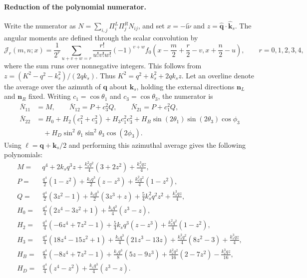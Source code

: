 \documentclass[a4paper,12pt]{article}
\newcommand{\ii}{\mathrm i}
\newcommand{\mb}{\mathbf}
\newcommand{\tn}{\tilde\nu}
\begin{document}
\paragraph{Reduction of the polynomial numerator.}
\label{sec:bubble-reduction}
Write the numerator as
$N=\sum_{i,j}\Pi_i^L\Pi_j^R N_{ij}$, and set
$x=-\ii\tn$ and $z=\widehat{\mb q}\cdot\widehat{\mb k}_s$.
The angular moments are defined through the scalar convolution by
\begin{equation}
 \mathcal J_r(m,n;x)=\frac1{2^r}
 \sum_{u+v+w=r}\frac{r!}{u!v!w!}(-1)^{v+w}
 f_0\left(x-\frac m2+\frac r2-v,x+\frac n2-u\right),
 \qquad r=0,1,2,3,4,
 \label{eq:bubble-reduction}
\end{equation}
where the sum runs over nonnegative integers. This follows from
$z=(K^2-q^2-k_s^2)/(2qk_s)$.
Thus $K^2=q^2+k_s^2+2qk_sz$. Let an overline denote the average
over the azimuth of $\mb q$ about $\mb k_s$, holding the external
directions $\mb n_L$ and $\mb n_R$ fixed.
Writing $c_1=\cos\theta_1$ and $c_3=\cos\theta_3$, the numerator is
\begin{align}
 \overline N_{11}&=M,\qquad
 \overline N_{12}=P+c_3^2Q,\qquad
 \overline N_{21}=P+c_1^2Q,\nonumber\\
 \overline N_{22}&=H_0+H_2(c_1^2+c_3^2)+H_3c_1^2c_3^2
 +H_B\sin(2\theta_1)\sin(2\theta_3)\cos\phi_3\nonumber\\
 &\quad+H_D\sin^2\theta_1\sin^2\theta_3\cos(2\phi_3).
 \label{eq:top-loop-numerator}
\end{align}
Using $\bm\ell=\mb q+\mb k_s/2$ and performing this azimuthal
average gives the following polynomials:
\begin{align}
 M={}&q^4+2k_sq^3z+\frac{k_s^2q^2}{4}(3+2z^2)
       +\frac{k_s^3qz}{4},\nonumber\\
 P={}&\frac{q^4}{2}(1-z^2)+\frac{k_sq^3}{2}(z-z^3)
       +\frac{k_s^2q^2}{4}(1-z^2),\nonumber\\
 Q={}&\frac{q^4}{2}(3z^2-1)+\frac{k_sq^3}{2}(3z^3+z)
       +\frac54 k_s^2q^2z^2+\frac{k_s^3qz}{4},\nonumber\\
 H_0={}&\frac{q^4}{4}(2z^4-3z^2+1)
       +\frac{k_sq^3}{4}(z^3-z),\nonumber\\
 H_2={}&\frac{q^4}{4}(-6z^4+7z^2-1)
       +\frac54 k_sq^3(z-z^3)+\frac{k_s^2q^2}{4}(1-z^2),\nonumber\\
 H_3={}&\frac{q^4}{4}(18z^4-15z^2+1)
       +\frac{k_sq^3}{4}(21z^3-13z)
       +\frac{k_s^2q^2}{4}(8z^2-3)+\frac{k_s^3qz}{4},\nonumber\\
 H_B={}&\frac{q^4}{8}(-8z^4+7z^2-1)
       +\frac{k_sq^3}{8}(5z-9z^3)
       +\frac{k_s^2q^2}{16}(2-7z^2)-\frac{k_s^3qz}{16},\nonumber\\
 H_D={}&\frac{q^4}{4}(z^4-z^2)+\frac{k_sq^3}{4}(z^3-z).
 \label{eq:top-loop-polynomials}
\end{align}
\end{document}
